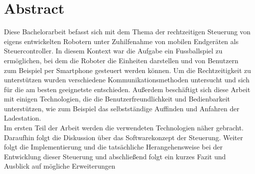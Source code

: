 \chapter*{Abstract}
Diese Bachelorarbeit befasst sich mit dem Thema der rechtzeitigen Steuerung von eigens entwickelten Robotern unter Zuhilfenahme von mobilen Endgeräten als Steuercontroller. In diesem Kontext war die Aufgabe ein Fussballspiel zu ermöglichen, bei dem die Roboter die Einheiten darstellen und von Benutzern zum Beispiel per Smartphone gesteuert werden können. Um die Rechtzeitigkeit zu unterstützen wurden verschiedene Kommunikationsmethoden untersucht und sich für die am besten geeignetste entschieden. Außerdem beschäftigt sich diese Arbeit mit einigen Technologien, die die Benutzerfreundlichkeit und Bedienbarkeit unterstützen, wie zum Beispiel das selbstständige Auffinden und Anfahren der Ladestation. \\
Im ersten Teil der Arbeit werden die verwendeten Technologien näher gebracht. Daraufhin folgt die Diskussion über das Softwarekonzept der Steuerung. Weiter folgt die Implementierung und die tatsächliche Herangehensweise bei der Entwicklung dieser Steuerung und abschließend folgt ein kurzes Fazit und Ausblick auf mögliche Erweiterungen
